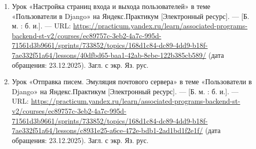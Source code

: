 \documentclass[bachelor, och, pract]{../SCWorks}
\begin{document}
\begin{enumerate}
    \item Урок «Настройка страниц входа и выхода пользователей» в теме «Пользователи в Django» на Яндекс.Практикум [Электронный ресурс]. — [Б. м. : б. и.]. — URL: \url{https://practicum.yandex.ru/learn/associated-programs-backend-st-v2/courses/ec89757c-3eb2-4a7c-995d-71561d3b9661/sprints/733852/topics/168d1c84-dc89-4dd9-b18f-7ae332f51a64/lessons/40dfbd65-baa1-42ab-8ebe-122b385cb589/} (дата обращения: 23.12.2025). Загл. с экр. Яз. рус.

    \item Урок «Отправка писем. Эмуляция почтового сервера» в теме «Пользователи в Django» на Яндекс.Практикум [Электронный ресурс]. — [Б. м. : б. и.]. — URL: \url{https://practicum.yandex.ru/learn/associated-programs-backend-st-v2/courses/ec89757c-3eb2-4a7c-995d-71561d3b9661/sprints/733852/topics/168d1c84-dc89-4dd9-b18f-7ae332f51a64/lessons/c8931e25-a6ce-472e-bdb1-2ad1bd1f2e1f/} (дата обращения: 23.12.2025). Загл. с экр. Яз. рус.
\end{enumerate}
\end{document}
